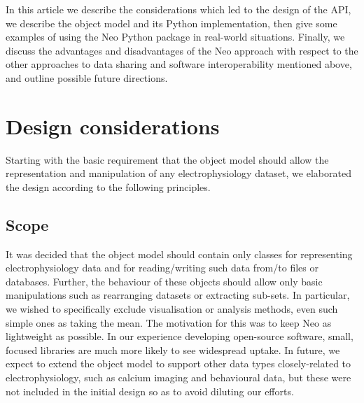 \documentclass{frontiers}
\begin{document}
In this article we describe the considerations which led to the design of the API, we describe the object model and its Python implementation, then give some examples of using the Neo Python package in real-world situations. Finally, we discuss the advantages and disadvantages of the Neo approach with respect to the other approaches to data sharing and software interoperability mentioned above, and outline possible future directions.


\section{Design considerations}


Starting with the basic requirement that the object model should allow the representation and manipulation of any electrophysiology dataset, we elaborated the design according to the following principles. 

\subsection{Scope}

It was decided that the object model should contain only classes for representing electrophysiology data and for reading/writing such data from/to files or databases. Further, the behaviour of these objects should allow only basic manipulations such as rearranging datasets or extracting sub-sets. In particular, we wished to specifically exclude visualisation or analysis methods, even such simple ones as taking the mean. The motivation for this was to keep Neo as lightweight as possible. In our experience developing open-source software, small, focused libraries are much more likely to see widespread uptake. In future, we expect to extend the object model to support other data types closely-related to electrophysiology, such as calcium imaging and behavioural data, but these were not included in the initial design so as to avoid diluting our efforts.
\end{document}
